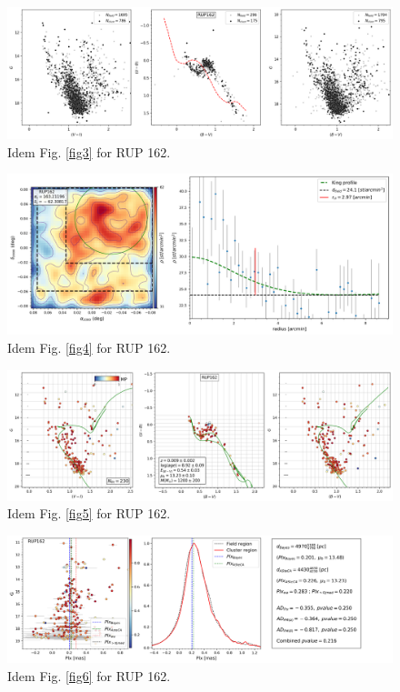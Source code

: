 \documentclass[draft]{aa}
\begin{document}
\begin{figure}[ht]
    \centering
    \includegraphics[width=\hsize]{../figs/obs_RUP162.png}
    \caption{Idem Fig. \ref{fig3} for RUP 162.}
    \label{fig47}
\end{figure}
\begin{figure}[ht]
    \centering
    \includegraphics[width=\hsize]{../figs/dmap_rup162.png}
    \caption{Idem Fig. \ref{fig4} for RUP 162.}
    \label{fig48}
\end{figure}
\begin{figure}[ht]
    \centering
    \includegraphics[width=\hsize]{../figs/cmds_rup162.png}
    \caption{Idem Fig. \ref{fig5} for RUP 162.}
    \label{fig49}
\end{figure}
\begin{figure}[ht]
    \centering
    \includegraphics[width=\hsize]{../figs/plx_RUP162.png}
    \caption{Idem Fig. \ref{fig6} for RUP 162.}
    \label{fig50}
\end{figure}
\end{document}
